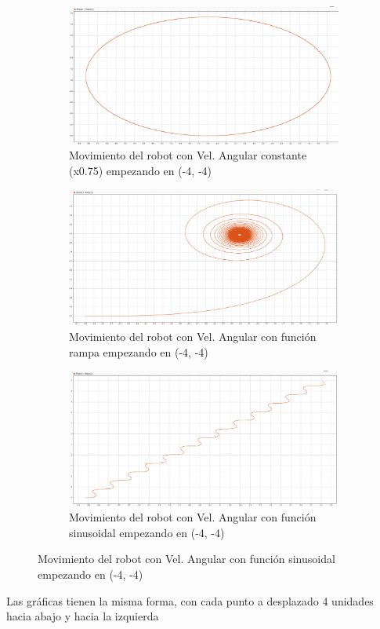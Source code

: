 \documentclass[a4paper, 12pt]{article}
\begin{document}
    \begin{figure}[ht]
		\begin{subfigure}{0.49\textwidth}
			\centering
			\includegraphics[width=\textwidth]{figures/Velocidad_Angular_Constante_pos_cambiada.png}
			\caption{Movimiento del robot con Vel. Angular constante (x0.75) empezando en (-4, -4)}
		\end{subfigure}
		\begin{subfigure}{0.49\textwidth}
			\centering
			\includegraphics[width=\textwidth]{figures/VA_rampa_pos_cambiada.png}
			\caption{Movimiento del robot con Vel. Angular con función rampa empezando en (-4, -4)}
		\end{subfigure}
		\begin{subfigure}{0.49\textwidth}
			\centering
			\includegraphics[width=\textwidth]{figures/VA_sin_pos_cambiada.png}
			\caption{Movimiento del robot con Vel. Angular con función sinusoidal empezando en (-4, -4)}
		\end{subfigure}
	\end{figure}

        Las gráficas tienen la misma forma, con cada punto a desplazado 4 unidades hacia abajo y hacia la izquierda
\end{document}
